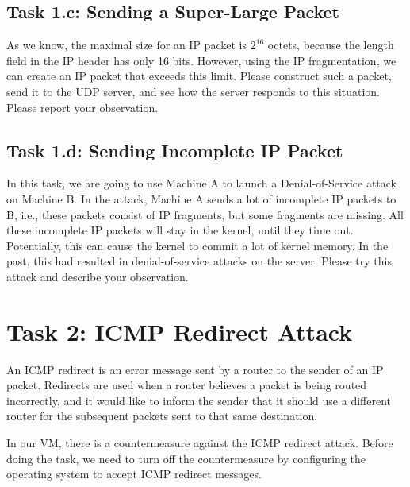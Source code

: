 \subsection{Task 1.c: Sending a Super-Large Packet}

As we know, the maximal size for an IP packet is $2^{16}$ octets, because
the length field in the IP header has only 16 bits. 
However,
using the IP fragmentation, we can create an IP packet that 
exceeds this limit. Please construct such a packet, send
it to the UDP server, and see how the server responds to this 
situation. Please report your observation. 
  



\subsection{Task 1.d: Sending Incomplete IP Packet}


In this task, we are going to use Machine A to launch a Denial-of-Service attack 
on Machine B. In the attack, Machine A sends  a lot of 
incomplete IP packets to B, i.e., these packets consist of 
IP fragments, but some fragments are missing. All these incomplete IP packets 
will stay in the kernel, until they time out. Potentially, this can
cause the kernel to commit a lot of kernel memory. In the past, this 
had resulted in denial-of-service attacks on the server. Please try 
this attack and describe your observation. 




\section{Task 2: ICMP Redirect Attack}

An ICMP redirect is an error message sent by a router to the sender of an
IP packet. Redirects are used when a router believes a packet is being
routed incorrectly, and it would like to inform the sender that it should
use a different router for the subsequent packets sent to that same
destination.


In our VM, there is a countermeasure against the ICMP redirect attack. Before doing
the task, we need to turn off the countermeasure by configuring the operating system
to accept ICMP redirect messages. 

